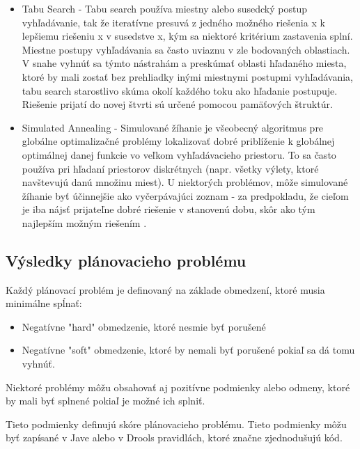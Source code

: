 \begin{itemize}
\begin{itemize}
\item Tabu Search - Tabu search používa miestny alebo susedcký postup vyhľadávanie, tak že iteratívne presuvá z jedného možného riešenia x k lepšiemu riešeniu x  v susedstve x, kým sa niektoré kritérium zastavenia splní. Miestne postupy vyhľadávania sa často uviaznu v zle bodovaných oblastiach. V snahe vyhnúť sa týmto nástrahám a preskúmať oblasti hľadaného miesta, ktoré by mali zostať bez prehliadky inými miestnymi postupmi vyhľadávania, tabu search starostlivo skúma okolí každého toku ako hľadanie postupuje. Riešenie prijatí do novej štvrti  sú určené pomocou pamäťových štruktúr.

\item Simulated Annealing - Simulované žíhanie je všeobecný algoritmus pre globálne optimalizačné problémy lokalizovať dobré priblíženie k globálnej optimálnej danej funkcie vo veľkom vyhľadávacieho priestoru. To sa často používa pri hľadaní priestorov diskrétnych (napr. všetky výlety, ktoré navštevujú danú množinu miest). U niektorých problémov, môže simulované žíhanie byť účinnejšie ako vyčerpávajúci zoznam - za predpokladu, že cieľom je iba nájsť prijateľne dobré riešenie v stanovenú dobu, skôr ako tým najlepším možným riešením .

\end{itemize}

\end{itemize}






\subsection{Výsledky plánovacieho problému}


Každý plánovací problém je definovaný na základe obmedzení, ktoré musia minimálne spĺnať: \cite{optabook}
\begin{itemize}
\item Negatívne "hard" obmedzenie, ktoré nesmie byť porušené
\item Negatívne "soft" obmedzenie, ktoré by nemali byť porušené pokiaľ sa dá tomu vyhnúť.
\end{itemize}

Niektoré problémy môžu obsahovať aj pozitívne podmienky alebo odmeny, ktoré by mali byť splnené pokiaľ je možné ich splniť.

Tieto podmienky definujú skóre plánovacieho problému. Tieto podmienky môžu byť zapísané v Jave alebo v Drools pravidlách, ktoré značne zjednodušujú kód.

